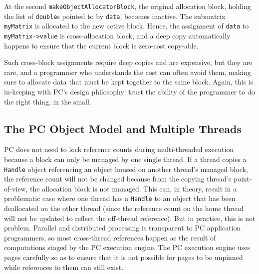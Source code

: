 At the second \texttt{makeObjectAllocatorBlock}, the original allocation block, holding the list of \texttt{double}s pointed to by \texttt{data}, becomes
inactive.  The submatrix \texttt{myMatrix} is allocated to the new active block.  
Hence, the assignment of \texttt{data} to \texttt{myMatrix->value} is cross-allocation block, and a deep copy automatically happens to ensure that
the current block is zero-cost copy-able.  

Such cross-block assignments require deep copies and are
expensive, but they are rare, and a programmer who understands the cost can often avoid them, making sure to allocate
data that must be kept together to the same block.
Again, this is in-keeping with PC's design philosophy: trust the ability of the programmer to do the right thing, in the small.

\subsection{The PC Object Model and Multiple Threads}

PC does not need to lock reference counts during multi-threaded execution
because 
a block can only be managed by one single thread.  
If a thread copies a \texttt{Handle} object referencing an object housed on another thread's managed block, 
the reference count will not be changed because from the copying thread's point-of-view, the allocation block is not managed.
This can, in theory, result in a problematic case where one thread has a \texttt{Handle} to an object that has been deallocated on the other thread (since
the reference count on the home thread will not be updated to reflect
the off-thread reference).  But in practice, this is not
problem.  Parallel and distributed processing is transparent to PC application
programmers, so most cross-thread references happen as the result of computations staged by the 
PC execution engine.  The PC execution engine uses pages carefully so as to ensure that 
it is not possible for pages to be unpinned while references to them can still exist.

